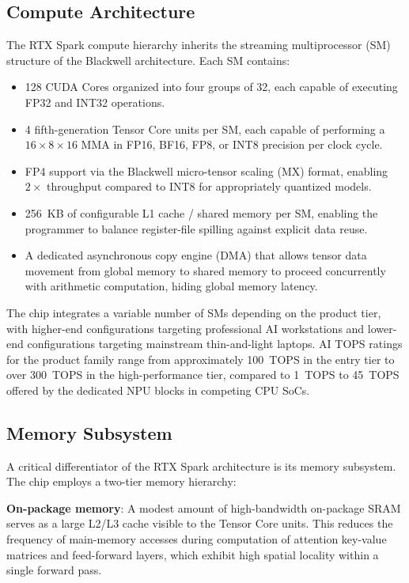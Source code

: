 \documentclass[conference]{IEEEtran}
\begin{document}
\subsection{Compute Architecture}

The RTX Spark compute hierarchy inherits the streaming multiprocessor (SM) structure of the Blackwell architecture. Each SM contains:

\begin{itemize}
    \item 128 CUDA Cores organized into four groups of 32, each capable of executing FP32 and INT32 operations.
    \item 4 fifth-generation Tensor Core units per SM, each capable of performing a $16 \times 8 \times 16$ MMA in FP16, BF16, FP8, or INT8 precision per clock cycle.
    \item FP4 support via the Blackwell micro-tensor scaling (MX) format, enabling $2\times$ throughput compared to INT8 for appropriately quantized models.
    \item 256~KB of configurable L1 cache / shared memory per SM, enabling the programmer to balance register-file spilling against explicit data reuse.
    \item A dedicated asynchronous copy engine (DMA) that allows tensor data movement from global memory to shared memory to proceed concurrently with arithmetic computation, hiding global memory latency.
\end{itemize}

The chip integrates a variable number of SMs depending on the product tier, with higher-end configurations targeting professional AI workstations and lower-end configurations targeting mainstream thin-and-light laptops. AI TOPS ratings for the product family range from approximately 100~TOPS in the entry tier to over 300~TOPS in the high-performance tier, compared to 1~TOPS to 45~TOPS offered by the dedicated NPU blocks in competing CPU SoCs.

\subsection{Memory Subsystem}

A critical differentiator of the RTX Spark architecture is its memory subsystem. The chip employs a two-tier memory hierarchy:

\textbf{On-package memory}: A modest amount of high-bandwidth on-package SRAM serves as a large L2/L3 cache visible to the Tensor Core units. This reduces the frequency of main-memory accesses during computation of attention key-value matrices and feed-forward layers, which exhibit high spatial locality within a single forward pass.
\end{document}
